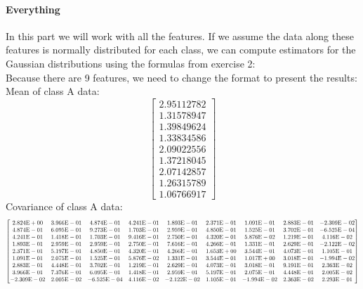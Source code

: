 \documentclass[a4paper, 10pt]{article}
\newcommand\scalemath[2]{\scalebox{#1}{\mbox{\ensuremath{\displaystyle #2}}}}
\begin{document}
\paragraph{Everything}
In this part we will work with all the features. 
If we assume the data along these features is normally distributed for each class, we can compute
estimators for the Gaussian distributions using the formulas from exercise 2:
\\
Because there are 9 features, we need to change the format to present the results:
\\
Mean of class A data:
$$
\begin{bmatrix}
    2.95112782\\
    1.31578947\\
    1.39849624\\
    1.33834586\\
    2.09022556\\
    1.37218045\\
    2.07142857\\
    1.26315789\\
    1.06766917
\end{bmatrix}
$$
Covariance of class A data:
$$
\scalemath{0.7}{
\begin{bmatrix}
    2.824\text{E}+00 & 3.966\text{E}-01 & 4.874\text{E}-01 & 4.241\text{E}-01 & 1.893\text{E}-01 & 2.371\text{E}-01 & 1.091\text{E}-01 & 2.883\text{E}-01 & -2.309\text{E}-02\\
    4.874\text{E}-01 & 6.095\text{E}-01 & 9.273\text{E}-01 & 1.703\text{E}-01 & 2.959\text{E}-01 & 4.850\text{E}-01 & 1.525\text{E}-01 & 3.702\text{E}-01 & -6.525\text{E}-04\\  
    4.241\text{E}-01 & 1.418\text{E}-01 & 1.703\text{E}-01 & 9.416\text{E}-01 & 2.750\text{E}-01 & 4.320\text{E}-01 & 5.876\text{E}-02 & 1.219\text{E}-01 & 4.116\text{E}-02\\
    1.893\text{E}-01 & 2.959\text{E}-01 & 2.959\text{E}-01 & 2.750\text{E}-01 & 7.616\text{E}-01 & 4.266\text{E}-01 & 1.331\text{E}-01 & 2.629\text{E}-01 & -2.122\text{E}-02\\
    2.371\text{E}-01 & 5.197\text{E}-01 & 4.850\text{E}-01 & 4.320\text{E}-01 & 4.266\text{E}-01 & 1.653\text{E}+00 & 3.544\text{E}-01 & 4.073\text{E}-01 & 1.105\text{E}-01\\
    1.091\text{E}-01 & 2.075\text{E}-01 & 1.525\text{E}-01 & 5.876\text{E}-02 & 1.331\text{E}-01 & 3.544\text{E}-01 & 1.017\text{E}+00 & 3.018\text{E}-01 & -1.994\text{E}-02\\
    2.883\text{E}-01 & 4.448\text{E}-01 & 3.702\text{E}-01 & 1.219\text{E}-01 & 2.629\text{E}-01 & 4.073\text{E}-01 & 3.018\text{E}-01 & 9.191\text{E}-01 & 2.363\text{E}-02\\
    3.966\text{E}-01 & 7.376\text{E}-01 & 6.095\text{E}-01 & 1.418\text{E}-01 & 2.959\text{E}-01 & 5.197\text{E}-01 & 2.075\text{E}-01 & 4.448\text{E}-01 & 2.005\text{E}-02\\
    -2.309\text{E}-02 & 2.005\text{E}-02 & -6.525\text{E}-04 & 4.116\text{E}-02 & -2.122\text{E}-02 & 1.105\text{E}-01 & -1.994\text{E}-02 & 2.363\text{E}-02 & 2.293\text{E}-01
\end{bmatrix}}
$$
\end{document}
